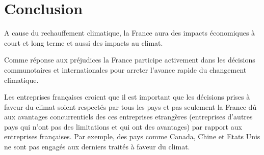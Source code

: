 \documentclass[a4paper,10pt]{article}
\begin{document}




\section*{Conclusion}


A cause du rechauffement climatique,  la France aura des impacts économiques à
court et long terme et aussi des impacts au climat.

Comme réponse aux préjudices la France participe activement dans les décisions
communotaires  et internationales  pour  arreter l'avance  rapide du  changement
climatique.

Les entreprises françaises  croient que  il est  important que  les décisions
prises à faveur du climat soient respectés par tous les pays et pas seulement la
France  dû   aux  avantages   concurrentiels  des  ces   entreprises  etrangères
(entreprises  d'autres  pays  qui n'ont  pas  des  limitations  et qui  ont  des
avantages) par rapport  aux entreprises françaises. Par exemple,  des pays comme
Canada, Chine et Etats Unis ne sont pas engagés aux derniers traités à faveur du
climat.


\nocite{GREENPEACE}
\nocite{FR}
\nocite{ACTU}
\nocite{GV}
\nocite{DIC}
\nocite{SEQ}
\nocite{DOC}

\begin{small}
  
\end{small}
\section*{}
\end{document}
